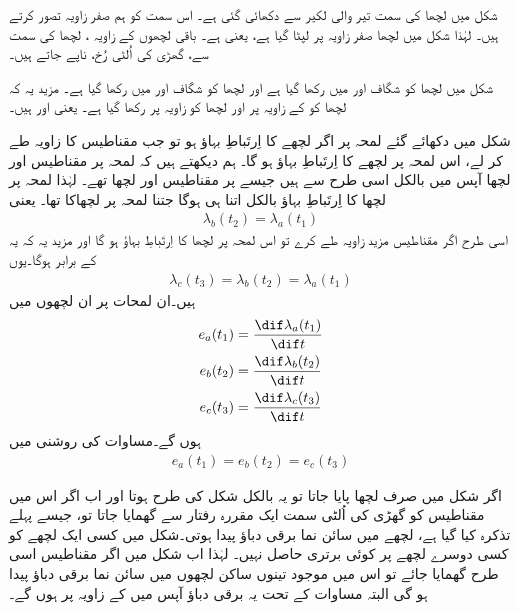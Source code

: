  شکل  میں لچھا  کی سمت تیر والی لکیر سے دکھائی گئی ہے۔ اس سمت کو ہم صفر زاویہ تصور کرتے ہیں۔ لہٰذا شکل میں  لچھا صفر زاویہ پر لپٹا گیا ہے، یعنی  ہے۔ باقی لچھوں کے زاویہ ، لچھا  کی سمت سے، گھڑی کی اُلٹی رُخ، ناپے جاتے ہیں۔

شکل  میں لچھا  کو شگاف  اور  میں رکھا گیا ہے اور لچھا  کو شگاف  اور  میں رکھا گیا ہے۔ مزید یہ کہ لچھا  کو  کے زاویہ پر اور لچھا  کو  زاویہ پر رکھا گیا ہے۔ یعنی  اور  ہیں۔

 شکل  میں دکھائے گئے لمحہ  پر  اگر لچھے  کا  اِرتَباطِ بہاؤ  ہو تو جب مقناطیس  کا زاویہ طے کر لے، اس لمحہ  پر  لچھے  کا اِرتَباطِ بہاؤ  ہو گا۔ ہم  دیکھتے ہیں کہ لمحہ  پر مقناطیس اور لچھا  آپس میں بالکل اسی طرح سے ہیں جیسے  پر مقناطیس اور لچھا  تھے۔ لہٰذا لمحہ  پر لچھا  کا اِرتَباطِ بہاؤ بالکل اتنا ہی ہوگا جتنا لمحہ  پر   لچھاکا تھا۔ یعنی
\begin{align}
\lambda_b(t_2)=\lambda_a(t_1)
\end{align}
اسی طرح اگر مقناطیس مزید   زاویہ طے کرے تو اس لمحہ  پر لچھا  کا اِرتَباطِ بہاؤ   ہو گا اور مزید یہ کہ یہ  کے برابر ہوگا۔یوں
\begin{align}
\lambda_c(t_3)=\lambda_b(t_2)=\lambda_a(t_1)
\end{align}
ہیں۔ان لمحات پر ان  لچھوں میں
\begin{align}
e_a(t_1)&=\frac{\dif \lambda_a(t_1)}{\dif t}\\
e_b(t_2)&=\frac{\dif \lambda_b(t_2)}{\dif t}\\
e_c(t_3)&=\frac{\dif \lambda_c(t_3)}{\dif t}
\end{align}
ہوں گے۔مساوات    کی روشنی میں
\begin{align}
e_a(t_1)=e_b(t_2)=e_c(t_3)
\end{align} 

اگر شکل میں صرف لچھا  پایا جاتا تو یہ بالکل شکل   کی طرح ہوتا اور اب اگر اس میں مقناطیس کو گھڑی کی اُلٹی سمت ایک مقررہ رفتار  سے گھمایا جاتا تو، جیسے پہلے تذکرہ کیا گیا ہے، لچھے  میں سائن نما برقی دباؤ پیدا ہوتی۔شکل  میں کسی ایک لچھے کو کسی دوسرے لچھے پر کوئی برتری حاصل نہیں۔ لہٰذا اب شکل  میں اگر مقناطیس اسی طرح گھمایا جائے تو اس میں موجود تینوں ساکن لچھوں میں سائن نما برقی دباؤ پیدا ہو گی البتہ مساوات    کے تحت یہ برقی دباؤ آپس میں   کے زاویہ پر ہوں گے۔

